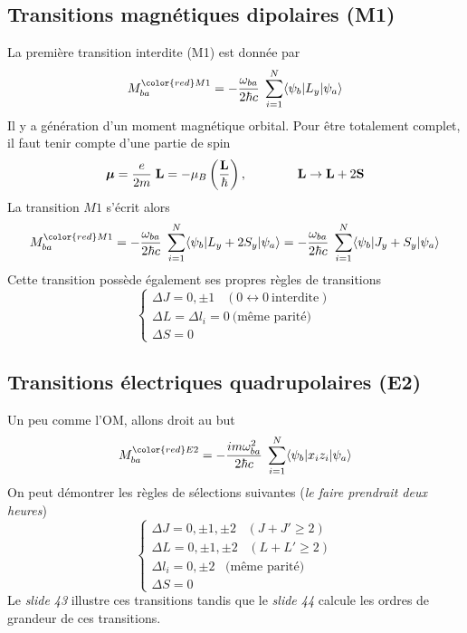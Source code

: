 \subsection{Transitions magnétiques dipolaires (M1)}
La première transition interdite (M1) est donnée par
\begin{equation}
 M_{ba}^{{\color{red} M1}}   =   - \frac{\omega_{ba}}{2 \hbar c} \; 
\sum_{i= 1}^N 
 \langle \psi_b \vert 
 L_y \vert \psi_a \rangle
\end{equation}
Il y a génération d'un moment magnétique orbital. Pour être totalement complet, il faut tenir compte
d'une partie de spin
\begin{equation}
 \mbox{\boldmath $ \mu $} =
 \frac{e}{2m} \; {\bf L} 
= - \mu_B \left(  \frac{{\bf L}}{\hbar}\right),\qquad \qquad
 {\bf L}  \rightarrow  {\bf L} + 2 {\bf S}
\end{equation}
La transition $M1$ s'écrit alors
\begin{equation}
 M_{ba}^{{\color{red} M1}}   =   - \frac{\omega_{ba}}{2 \hbar c} \; 
\sum_{i= 1}^N 
 \langle \psi_b \vert 
 L_y + 2S_y \vert \psi_a \rangle
=
- \frac{\omega_{ba}}{2 \hbar c} \; 
\sum_{i= 1}^N 
 \langle \psi_b \vert 
 J_y + S_y \vert \psi_a \rangle
\end{equation}
Cette transition possède également ses propres règles de transitions
\begin{equation}
\left\{
\begin{array}{l}
\Delta J = 0, \pm 1 
\; \; \; (0 \leftrightarrow 0 ~\mbox{interdite}) \\
\Delta L = \Delta l_i = 0 ~\mbox{(m\^eme parit\'e)} \\
\Delta S = 0  
\end{array}
\right.
\end{equation}

\subsection{Transitions électriques quadrupolaires (E2)}
Un peu comme l'OM, allons droit au but
\begin{equation}
 M_{ba}^{{\color{red} E2}}    =   - \frac{i m \omega_{ba}^2}{2 \hbar c} \; 
\sum_{i= 1}^N 
 \langle \psi_b \vert 
 x_i z_i  \vert \psi_a \rangle
\end{equation}
On peut démontrer les règles de sélections suivantes (\textit{le faire prendrait deux heures})
\begin{equation}
\left\{
\begin{array}{l}
\Delta J = 0, \pm 1, \pm 2 
\; \; \; (J + J' \ge 2) \\
\Delta L = 0, \pm 1, \pm 2 
\; \; \; (L + L' \ge 2) \\ 
 \Delta l_i= 0, \pm 2 \; \; \; \mbox{(m\^eme  parit\'e)}\\
\Delta S = 0   
\end{array}
\right.
\end{equation}
Le \textit{slide 43} illustre ces transitions tandis que le \textit{slide 44} calcule les ordres
de grandeur de ces transitions.

